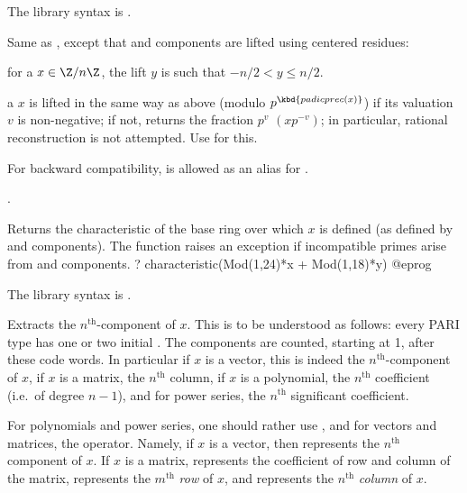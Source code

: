 The library syntax is .

\label{se:centerlift}
Same as , except that  and  components
are lifted using centered residues:

\item for a  $x\in \Z/n\Z$, the lift $y$ is such that
$-n/2<y\le n/2$.

\item  a  $x$ is lifted in the same way as above (modulo
$p^\kbd{padicprec(x)}$) if its valuation $v$ is non-negative; if not, returns
the fraction $p^v$ $(x p^{-v})$; in particular, rational
reconstruction is not attempted. Use  for this.

For backward compatibility,  is allowed as an alias
for .

.

\label{se:characteristic}
Returns the characteristic of the base ring over which $x$ is defined (as
defined by  and  components). The function raises an
exception if incompatible primes arise from  and 
components.
\bprog
? characteristic(Mod(1,24)*x + Mod(1,18)*y)
@eprog

The library syntax is .

\label{se:component}
Extracts the $n^{\text{th}}$-component of $x$. This is to be understood
as follows: every PARI type has one or two initial . The
components are counted, starting at 1, after these code words. In particular
if $x$ is a vector, this is indeed the $n^{\text{th}}$-component of $x$, if
$x$ is a matrix, the $n^{\text{th}}$ column, if $x$ is a polynomial, the
$n^{\text{th}}$ coefficient (i.e.~of degree $n-1$), and for power series,
the $n^{\text{th}}$ significant coefficient.

For polynomials and power series, one should rather use , and
for vectors and matrices, the \kbd{[$\,$]} operator. Namely, if $x$ is a
vector, then  represents the $n^{\text{th}}$ component of $x$. If
$x$ is a matrix,  represents the coefficient of row  and
column  of the matrix,  represents the $m^{\text{th}}$
\emph{row} of $x$, and  represents the $n^{\text{th}}$
\emph{column} of $x$.

